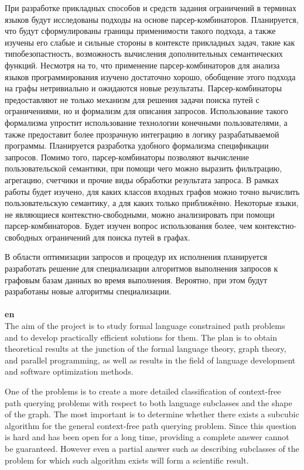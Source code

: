 \documentclass[12pt]{article}  %
\theoremstyle{remark}
\begin{document}
При разработке прикладных способов и средств задания ограничений в терминах языков будут исследованы подходы на основе парсер-комбинаторов.
Планируется, что будут сформулированы границы применимости такого подхода, а также изучены его слабые и сильные стороны в контексте прикладных задач, такие как типобезопастность, возможность вычисления дополнительных семантических функций.
Несмотря на то, что применение парсер-комбинаторов для анализа языков программирования изучено достаточно хорошо, обобщение этого подхода на графы нетривиально и ожидаются новые результаты.
Парсер-комбинаторы предоставляют не только механизм для решения задачи поиска путей с ограничениями, но и формализм для описания запросов.
Использование такого формализма упростит использование технологии конечными пользователями, а также предоставит более прозрачную интеграцию в логику разрабатываемой программы.
Планируется разработка удобного формализма спецификации запросов.
Помимо того, парсер-комбинаторы позволяют вычисление пользовательской семантики, при помощи чего можно выразить фильтрацию, агрегацию, счетчики и прочие виды обработки результата запроса.
В рамках работы будет изучено, для каких классов входных графов можно точно вычислить пользовательскую семантику, а для каких только приближённо.
Некоторые языки, не являющиеся контекстно-свободными, можно анализировать при помощи парсер-комбинаторов.
Будет изучен вопрос использования более, чем контекстно-свободных ограничений для поиска путей в графах.

В области оптимизации запросов и процедур их исполнения планируется разработать решение для специализации алгоритмов выполнения запросов к графовым базам данных во время выполнения.
Вероятно, при этом будут разработаны новые алгоритмы специализации.
\\
\\
\textbf{en}\\

The aim of the project is to study formal language constrained path problems and to develop practically efficient solutions for them.
The plan is to obtain theoretical results at the junction of the formal language theory, graph theory, and parallel programming, as well as results in the field of language development and software optimization methods.

One of the problems is to create a more detailed classification of context-free path querying problems with respect to both language subclasses and the shape of the graph.
The most important is to determine whether there exists a subcubic algorithm for the general context-free path querying problem.
Since this question is hard and has been open for a long time, providing a complete answer cannot be guaranteed.
However even a partial answer such as describing subclasses of the problem for which such algorithm exists will form a scientific result.
\end{document}
